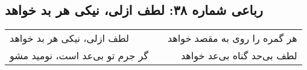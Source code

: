 \begin{center}
\section*{رباعی شماره ۳۸: لطف ازلی، نیکی هر بد خواهد}
\label{sec:038}
\begin{longtable}{l p{0.5cm} r}
لطف ازلی، نیکی هر بد خواهد
&&
هر گمره را روی به مقصد خواهد
\\
گر جرم تو بی‌عد است، نومید مشو
&&
لطف بی‌حد گناه بی‌عد خواهد
\\
\end{longtable}
\end{center}
